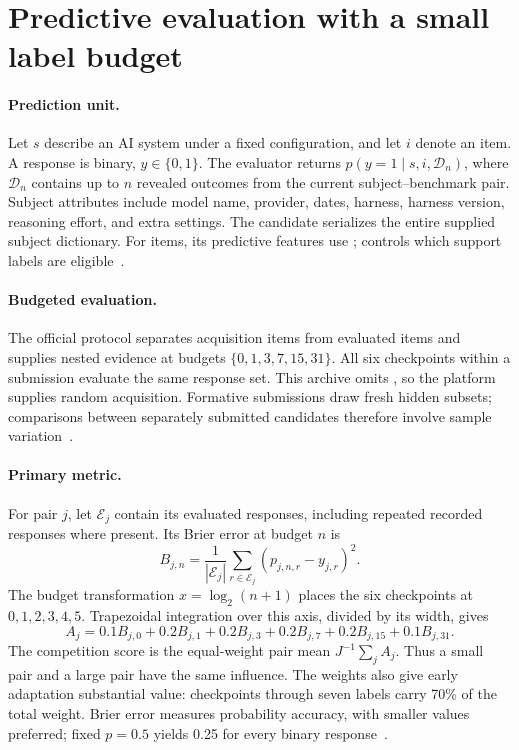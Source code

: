 \section{Predictive evaluation with a small label budget}
\label{sec:task}
\paragraph{Prediction unit.}
Let $s$ describe an AI system under a fixed configuration, and let $i$ denote an item. A response is binary, $y\in\{0,1\}$. The evaluator returns $p(y=1\mid s,i,\mathcal{D}_n)$, where $\mathcal{D}_n$ contains up to $n$ revealed outcomes from the current subject--benchmark pair. Subject attributes include model name, provider, dates, harness, harness version, reasoning effort, and extra settings. The candidate serializes the entire supplied subject dictionary. For items, its predictive features use ;  controls which support labels are eligible~\citep{release}.

\paragraph{Budgeted evaluation.}
The official protocol separates acquisition items from evaluated items and supplies nested evidence at budgets $\{0,1,3,7,15,31\}$. All six checkpoints within a submission evaluate the same response set. This archive omits , so the platform supplies random acquisition. Formative submissions draw fresh hidden subsets; comparisons between separately submitted candidates therefore involve sample variation~\citep{paiec2026}.

\paragraph{Primary metric.}
For pair $j$, let $\mathcal{E}_j$ contain its evaluated responses, including repeated recorded responses where present. Its Brier error at budget $n$ is
\begin{equation}
 B_{j,n}=\frac{1}{|\mathcal{E}_j|}\sum_{r\in\mathcal{E}_j}(p_{j,n,r}-y_{j,r})^2.
 \label{eq:brier}
\end{equation}
The budget transformation $x=\log_2(n+1)$ places the six checkpoints at $0,1,2,3,4,5$. Trapezoidal integration over this axis, divided by its width, gives
\begin{equation}
 A_j=0.1B_{j,0}+0.2B_{j,1}+0.2B_{j,3}+0.2B_{j,7}+0.2B_{j,15}+0.1B_{j,31}.
 \label{eq:alc}
\end{equation}
The competition score is the equal-weight pair mean $J^{-1}\sum_j A_j$. Thus a small pair and a large pair have the same influence. The weights also give early adaptation substantial value: checkpoints through seven labels carry 70\% of the total weight. Brier error measures probability accuracy, with smaller values preferred; fixed $p=0.5$ yields 0.25 for every binary response~\citep{brier1950,paiec2026}.

